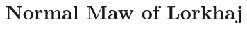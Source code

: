 \documentclass[12pt,a4paper]{article}
\begin{document}
\title{Normal Maw of Lorkhaj}
\author{}
\date{}
\maketitle

\end{document}
